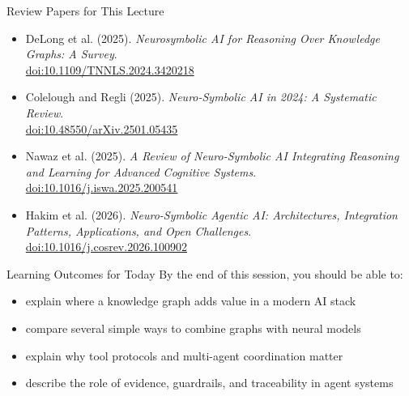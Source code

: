 \documentclass[aspectratio=169]{beamer}
\begin{document}
\begin{frame}{Review Papers for This Lecture}
\footnotesize
\begin{itemize}
  \item DeLong et al. (2025). \textit{Neurosymbolic AI for Reasoning Over Knowledge Graphs: A Survey}.\\
  \href{https://doi.org/10.1109/TNNLS.2024.3420218}{doi:10.1109/TNNLS.2024.3420218}
  \item Colelough and Regli (2025). \textit{Neuro-Symbolic AI in 2024: A Systematic Review}.\\
  \href{https://doi.org/10.48550/arXiv.2501.05435}{doi:10.48550/arXiv.2501.05435}
  \item Nawaz et al. (2025). \textit{A Review of Neuro-Symbolic AI Integrating Reasoning and Learning for Advanced Cognitive Systems}.\\
  \href{https://doi.org/10.1016/j.iswa.2025.200541}{doi:10.1016/j.iswa.2025.200541}
  \item Hakim et al. (2026). \textit{Neuro-Symbolic Agentic AI: Architectures, Integration Patterns, Applications, and Open Challenges}.\\
  \href{https://doi.org/10.1016/j.cosrev.2026.100902}{doi:10.1016/j.cosrev.2026.100902}
\end{itemize}
\end{frame}

\begin{frame}{Learning Outcomes for Today}
By the end of this session, you should be able to:
\begin{itemize}
  \item explain where a knowledge graph adds value in a modern AI stack
  \item compare several simple ways to combine graphs with neural models
  \item explain why tool protocols and multi-agent coordination matter
  \item describe the role of evidence, guardrails, and traceability in agent systems
\end{itemize}
\end{frame}
\end{document}
